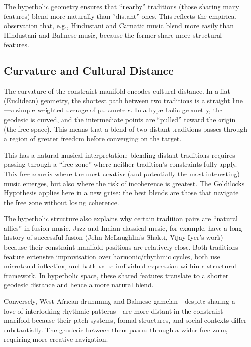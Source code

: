 \documentclass[cmj]{article}
\begin{document}
The hyperbolic geometry ensures that ``nearby'' traditions (those sharing many
features) blend more naturally than ``distant'' ones. This reflects the
empirical observation that, e.g., Hindustani and Carnatic music blend more
easily than Hindustani and Balinese music, because the former share more
structural features.

\subsection{Curvature and Cultural Distance}

The curvature of the constraint manifold encodes cultural distance. In a flat
(Euclidean) geometry, the shortest path between two traditions is a straight
line---a simple weighted average of parameters. In a hyperbolic geometry, the
geodesic is curved, and the intermediate points are ``pulled'' toward the
origin (the free space). This means that a blend of two distant traditions
passes through a region of greater freedom before converging on the target.

This has a natural musical interpretation: blending distant traditions
requires passing through a ``free zone'' where neither tradition's constraints
fully apply. This free zone is where the most creative (and potentially the
most interesting) music emerges, but also where the risk of incoherence is
greatest. The Goldilocks Hypothesis applies here in a new guise: the best
blends are those that navigate the free zone without losing coherence.

The hyperbolic structure also explains why certain tradition pairs are
``natural allies'' in fusion music. Jazz and Indian classical music, for
example, have a long history of successful fusion (John McLaughlin's
Shakti, Vijay Iyer's work) because their constraint manifold positions are
relatively close. Both traditions feature extensive improvisation over
harmonic/rhythmic cycles, both use microtonal inflection, and both value
individual expression within a structural framework. In hyperbolic space,
these shared features translate to a shorter geodesic distance and hence a
more natural blend.

Conversely, West African drumming and Balinese gamelan---despite sharing a
love of interlocking rhythmic patterns---are more distant in the constraint
manifold because their pitch systems, formal structures, and social contexts
differ substantially. The geodesic between them passes through a wider free
zone, requiring more creative navigation.
\end{document}
